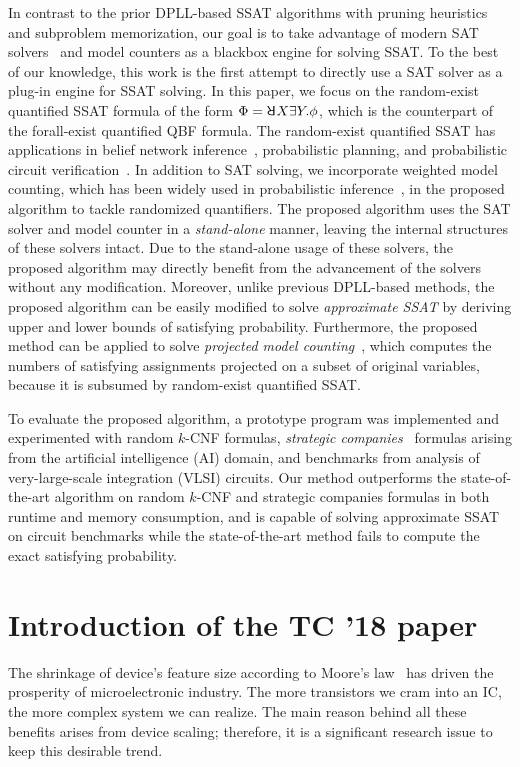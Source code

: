     In contrast to the prior DPLL-based SSAT algorithms with pruning heuristics and subproblem memorization, our goal is to take advantage of modern SAT solvers~\cite{Een2003Solver,Een2003Incremental} and model counters as a blackbox engine for solving SSAT.
    To the best of our knowledge, this work is the first attempt to directly use a SAT solver as a plug-in engine for SSAT solving.
    In this paper, we focus on the random-exist quantified SSAT formula of the form $\Phi=\random{} X \exists Y.\phi$, which is the counterpart of the forall-exist quantified QBF formula.
    The random-exist quantified SSAT has applications in belief network inference~\cite{Cooper1990,Bacchus2003}, probabilistic planning, and probabilistic circuit verification~\cite{LeeTC18ProbDesign}.
    In addition to SAT solving, we incorporate weighted model counting, which has been widely used in probabilistic inference~\cite{Sang2005BayesianInference,Chavira2008}, in the proposed algorithm to tackle randomized quantifiers.
    The proposed algorithm uses the SAT solver and model counter in a \textit{stand-alone} manner, leaving the internal structures of these solvers intact.
    Due to the stand-alone usage of these solvers, the proposed algorithm may directly benefit from the advancement of the solvers without any modification.
    Moreover, unlike previous DPLL-based methods, the proposed algorithm can be easily modified to solve \textit{approximate SSAT} by deriving upper and lower bounds of satisfying probability.
    Furthermore, the proposed method can be applied to solve \textit{projected model counting}~\cite{Aziz2015}, which computes the numbers of satisfying assignments projected on a subset of original variables, because it is subsumed by random-exist quantified SSAT.

    To evaluate the proposed algorithm, a prototype program was implemented and experimented with random $k$-CNF formulas, \textit{strategic companies}~\cite{Cadoli1997} formulas arising from the artificial intelligence (AI) domain, and benchmarks from analysis of very-large-scale integration (VLSI) circuits.
    Our method outperforms the state-of-the-art algorithm on random $k$-CNF and strategic companies formulas in both runtime and memory consumption, and is capable of solving approximate SSAT on circuit benchmarks while the state-of-the-art method fails to compute the exact satisfying probability.

    \section{Introduction of the TC '18 paper}
    The shrinkage of device's feature size according to Moore's law~\cite{Moore1965} has driven the prosperity of microelectronic industry.
    The more transistors we cram into an IC, the more complex system we can realize.
    The main reason behind all these benefits arises from device scaling;
    therefore, it is a significant research issue to keep this desirable trend.

